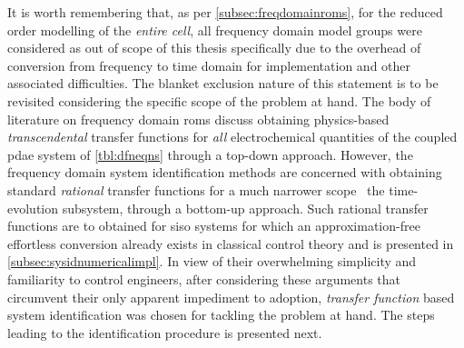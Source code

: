 It  is  worth remembering  that,  as  per \cref{subsec:freqdomainroms}, for  the
reduced order  modelling of the  \emph{entire cell}, all frequency  domain model
groups were considered  as out of scope  of this thesis specifically  due to the
overhead  of conversion  from frequency  to time  domain for  implementation and
other associated difficulties. The blanket exclusion nature of this statement is
to be revisited considering the specific scope  of the problem at hand. The body
of literature  on frequency  domain \glspl{rom} discuss  obtaining physics-based
\emph{transcendental}   transfer   functions  for   \emph{all}   electrochemical
quantities  of the  coupled  \gls{pdae} system  of \cref{tbl:dfneqns} through  a
top-down approach.  However, the frequency domain  system identification methods
are concerned with  obtaining standard \emph{rational} transfer  functions for a
much narrower  scope \viz~the time-evolution  subsystem, through  a bottom-up
approach.  Such  rational transfer  functions  are  to obtained  for  \gls{siso}
systems for which an approximation-free  effortless conversion already exists in
classical control  theory and is  presented in \cref{subsec:sysidnumericalimpl}.
In view of  their overwhelming simplicity and familiarity  to control engineers,
after considering these arguments that circumvent their only apparent impediment
to adoption, \emph{transfer function} based system identification was chosen for
tackling the problem at hand. The  steps leading to the identification procedure
is presented next.



